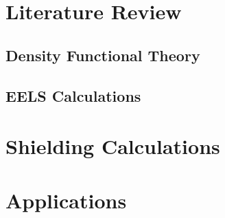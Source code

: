 \documentclass[12pt]{report}
\begin{document}
\chapter{Literature Review}

\section{Density Functional Theory}

\section{EELS Calculations}


\chapter{Shielding Calculations}




\chapter{Applications}

\end{document}
